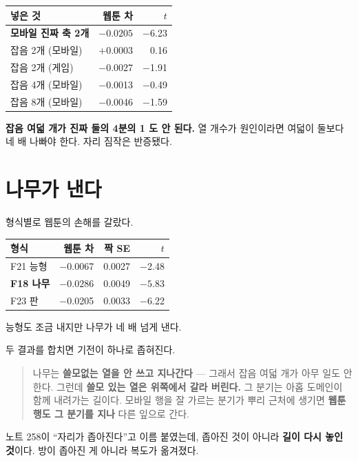 \documentclass[10pt]{article}
\begin{document}
\begin{center}\small
\begin{tabular}{lrr}
\hline
넣은 것 & 웹툰 차 & $t$ \\
\hline
\textbf{모바일 진짜 축 2개} & $\mathbf{-0.0205}$ & $-$6.23 \\
잡음 2개 (모바일) & $+$0.0003 & 0.16 \\
잡음 2개 (게임) & $-$0.0027 & $-$1.91 \\
잡음 4개 (모바일) & $-$0.0013 & $-$0.49 \\
잡음 8개 (모바일) & $-$0.0046 & $-$1.59 \\
\hline
\end{tabular}
\end{center}

\textbf{잡음 여덟 개가 진짜 둘의 4분의 1 도 안 된다.} 열 개수가 원인이라면
여덟이 둘보다 네 배 나빠야 한다. 자리 짐작은 반증됐다.

\section{나무가 낸다}

형식별로 웹툰의 손해를 갈랐다.

\begin{center}\small
\begin{tabular}{lrrr}
\hline
형식 & 웹툰 차 & 짝 SE & $t$ \\
\hline
F21 능형 & $-$0.0067 & 0.0027 & $-$2.48 \\
\textbf{F18 나무} & $\mathbf{-0.0286}$ & 0.0049 & $\mathbf{-5.83}$ \\
F23 판 & $-$0.0205 & 0.0033 & $-$6.22 \\
\hline
\end{tabular}
\end{center}

능형도 조금 내지만 나무가 네 배 넘게 낸다.

두 결과를 합치면 기전이 하나로 좁혀진다.

\begin{quote}
나무는 \textbf{쓸모없는 열을 안 쓰고 지나간다} --- 그래서 잡음 여덟 개가
아무 일도 안 한다. 그런데 \textbf{쓸모 있는 열은 위쪽에서 갈라 버린다.}
그 분기는 아홉 도메인이 함께 내려가는 길이다. 모바일 행을 잘 가르는 분기가
뿌리 근처에 생기면 \textbf{웹툰 행도 그 분기를 지나} 다른 잎으로 간다.
\end{quote}

노트 258이 ``자리가 좁아진다''고 이름 붙였는데, 좁아진 것이 아니라
\textbf{길이 다시 놓인 것}이다. 방이 좁아진 게 아니라 복도가 옮겨졌다.
\end{document}
